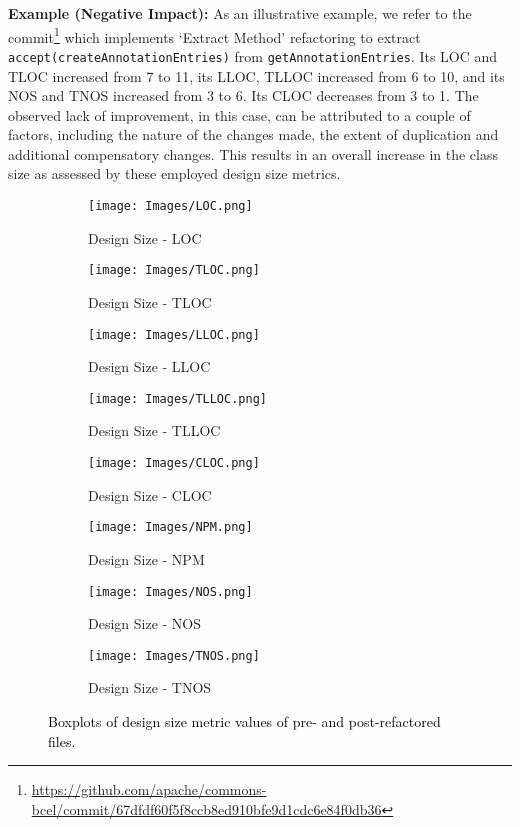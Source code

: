 \noindent\textbf{Example (Negative Impact):} As an illustrative example, we refer to the commit\footnote{\textcolor{black}{\url{https://github.com/apache/commons-bcel/commit/67dfdf60f5f8ccb8ed910bfe9d1cdc6e84f0db36}}} which implements `Extract Method' refactoring to extract \texttt{accept\break(createAnnotationEntries)} from \texttt{getAnnotationEntries}. Its LOC and TLOC increased from 7 to 11, its LLOC, TLLOC increased from 6 to 10, and its NOS and TNOS increased from 3 to 6. Its CLOC decreases from 3 to 1. The observed lack of improvement, in this case, can be attributed to a couple of factors, including the nature of the changes made, the extent of duplication and additional compensatory changes. This results in an overall increase in the class size as assessed by these employed design size metrics.
\begin{figure*}
\centering
\begin{subfigure}{3.5cm}
\centering\texttt{[image: Images/LOC.png]}
\caption{Design Size - LOC}
\label{BP:Design Size-loc}
\end{subfigure}%
\begin{subfigure}{3.5cm}
\centering\texttt{[image: Images/TLOC.png]}
\caption{Design Size - TLOC}
\label{BP:Design Size-tloc}
\end{subfigure}%
\begin{subfigure}{3.5cm}
\centering\texttt{[image: Images/LLOC.png]}
\caption{Design Size - LLOC}
\label{BP:Design Size-lloc}
\end{subfigure}%
\begin{subfigure}{3.5cm}
\centering\texttt{[image: Images/TLLOC.png]}
\caption{Design Size - TLLOC}
\label{BP:Design Size-tlloc}
\end{subfigure}%
\vspace{9pt}
\begin{subfigure}{3.5cm}
\centering\texttt{[image: Images/CLOC.png]}
\caption{Design Size - CLOC}
\label{BP:Design Size-cloc}
\end{subfigure}%
\begin{subfigure}{3.5cm}
\centering\texttt{[image: Images/NPM.png]}
\caption{Design Size - NPM}
\label{BP:Design Size-npm}
\end{subfigure}%
\begin{subfigure}{3.5cm}
\centering\texttt{[image: Images/NOS.png]}
\caption{Design Size - NOS}
\label{BP:Design Size-nos}
\end{subfigure}%
\begin{subfigure}{3.5cm}
\centering\texttt{[image: Images/TNOS.png]}
\caption{Design Size - TNOS}
\label{BP:Design Size-tnos}
\end{subfigure}

\caption{\textcolor{black}{Boxplots of design size metric values of pre- and post-refactored files.}}
\label{Chart:Boxplots_design size}
\end{figure*}
